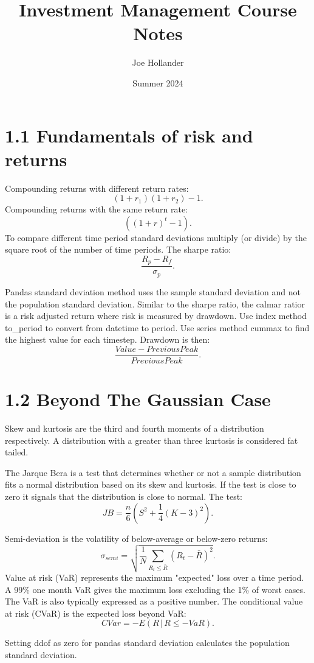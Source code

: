 \documentclass{article}
\title{Investment Management Course Notes}
\author{Joe Hollander}
\date{Summer 2024}
\begin{document}
\maketitle


\section*{1.1 Fundamentals of risk and returns}

Compounding returns with different return rates:
\[
(1 + r_1)(1 + r_2) - 1.
\]
Compounding returns with the same return rate:
\[
((1 + r)^t - 1). 
\]
To compare different time period standard deviations multiply (or divide)
by the square root of the number of time periods.
The sharpe ratio:
\[
\frac{R_p-R_f}{\sigma_p}.
\]

Pandas standard deviation method uses the sample
standard deviation and not the population standard
deviation. Similar to the sharpe ratio, the calmar
ratior is a risk adjusted return where risk is measured
by drawdown. Use index method to\_period to convert from
datetime to period. Use series method cummax to find the
highest value for each timestep. Drawdown is then: 
\[
\frac{Value - Previous Peak}{Previous Peak}.
\]

\section*{1.2 Beyond The Gaussian Case}

Skew and kurtosis are the third and fourth moments
of a distribution respectively. A distribution with
a greater than three kurtosis is considered fat tailed.

The Jarque Bera is a test that determines whether 
or not a sample distribution fits a normal distribution
based on its skew and kurtosis. If the test is close
to zero it signals that the distribution is close 
to normal. The test:
\[
JB = \frac{n}{6}\left(S^2 + \frac{1}{4}(K-3)^2\right).
\]

Semi-deviation is the volatility of below-average
or below-zero returns:
\[
\sigma_{semi} = 
\sqrt{\frac{1}{N}\sum_{R_t\le\bar{R}}(R_t-\bar{R})^2}.
\]
Value at risk (VaR) represents the maximum
"expected" loss over a time period. A 99\%
one month VaR gives the maximum loss excluding
the 1\% of worst cases. The VaR is also typically
expressed as a positive number. The conditional
value at risk (CVaR) is the expected loss beyond
VaR:
\[
CVar = -E(R \, | \, R \le -VaR).
\]

Setting ddof as zero for pandas standard deviation
calculates the population standard deviation.
\end{document}
